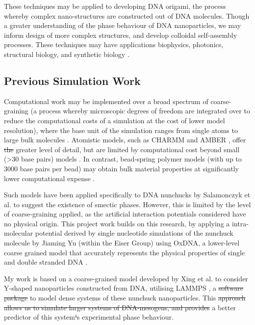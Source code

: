 \documentclass[11pt, a4paper]{article} %
\providecommand{\DIFadd}[1]{{\protect\color{blue}\uwave{#1}}} %
\providecommand{\DIFdel}[1]{{\protect\color{red}\sout{#1}}}                      %
\providecommand{\DIFaddbegin}{} %
\providecommand{\DIFaddend}{} %
\providecommand{\DIFdelbegin}{} %
\providecommand{\DIFdelend}{} %
\begin{document}
These techniques may be applied to developing DNA origami, the process whereby complex nano-structures are constructed out of DNA molecules. Though a greater understanding of the phase behaviour of DNA nanoparticles, we may inform design of more complex structures, and develop colloidal self-assembly processes. These techniques may have applications \DIFaddbegin \DIFadd{in }\DIFaddend biophysics, photonics, structural biology, and synthetic biology \cite{Nummelin2018, Praetorius2017, Bathe2017}.


\subsection{Previous Simulation Work} \label{sec:PrevWork}
Computational work may be implemented over a broad spectrum of coarse-graining (a process whereby microscopic degrees of freedom are integrated over to reduce the computational costs of a simulation at the cost of lower model resolution), where the base unit of the simulation ranges from single atoms to large bulk molecules \cite{Inglfsson2013, Potoyan2012}. Atomistic models, such as CHARMM \cite{MacKerell1995} and AMBER \cite{SalomonFerrer2012}, offer \DIFdelbegin \DIFdel{the }\DIFdelend \DIFaddbegin \DIFadd{a }\DIFaddend greater level of detail, but are limited by computational cost beyond small (>30 base pairs) models \cite{Cheatham2004}. In contrast, bead-spring polymer models (with up to 3000 base pairs per bead) may obtain bulk material properties at significantly lower computational expense \cite{Michieletto2016}.

Such models have been applied specifically to DNA nunchucks by Salamonczyk et al. \cite{Salamonczyk2016} to suggest the existence of smectic phases. However, this is limited by the level of coarse-graining applied, as the artificial interaction potentials considered have no physical origin. This project work builds on this research, by applying a intra-molecular potential derived by single nucleotide simulations of the nunchuck molecule by Jiaming Yu (within the Eiser Group) using OxDNA, a lower-level coarse grained model that accurately represents the physical properties of single and double stranded DNA \cite{OxDNA}.

My work is based on a coarse-grained model developed by Xing et al. \cite{Xing2019} to consider Y-shaped nanoparticles constructed from DNA, utilising LAMMPS \cite{LAMMPS}, a \DIFdelbegin \DIFdel{software package }\DIFdelend \DIFaddbegin \DIFadd{software-package }\DIFaddend to model dense systems of these nunchuck nanoparticles. This \DIFdelbegin \DIFdel{approach allows us to simulate larger systems of DNA-mesogens, and provides }\DIFdelend \DIFaddbegin \DIFadd{\textcolor{forestgreen}{approach allows us to simulate larger systems of DNA-mesogens, and provides} }\DIFaddend a better predictor of this system\DIFdelbegin \DIFdel{’}\DIFdelend \DIFaddbegin \DIFadd{'}\DIFaddend s experimental phase behaviour.
\end{document}
